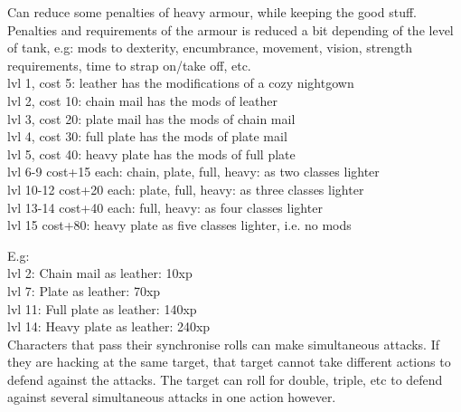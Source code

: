 Can reduce some penalties of heavy armour, while keeping the good stuff. Penalties and requirements of the armour is reduced a bit depending of the level of tank, e.g: mods to dexterity, encumbrance, movement, vision, strength requirements, time to strap on/take off, etc.\\
lvl 1, cost  5: leather has the modifications of a cozy nightgown\\
lvl 2, cost 10: chain mail has the mods of leather \\
lvl 3, cost 20: plate mail has the mods of chain mail \\
lvl 4, cost 30: full plate has the mods of plate mail \\
lvl 5, cost 40: heavy plate has the mods of full plate \\
lvl 6-9 cost+15 each: chain, plate, full, heavy: as two classes lighter \\ %
lvl 10-12 cost+20 each: plate, full, heavy: as three classes lighter \\    %
lvl 13-14 cost+40 each: full, heavy: as four classes lighter \\            %
lvl 15 cost+80: heavy plate as five classes lighter, i.e. no mods          %

\noindent E.g:\\
lvl  2: Chain mail as leather: 10xp\\     %
lvl  7: Plate as leather: 70xp\\          %
lvl 11: Full plate as leather: 140xp\\    %
lvl 14: Heavy plate as leather: 240xp\\   %

%
%
%


 Characters that pass their synchronise rolls can make simultaneous attacks. If they are hacking at the same target, that target cannot take different actions to defend against the attacks. The target can roll for double, triple, etc to defend against several simultaneous attacks in one action however.

